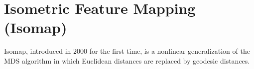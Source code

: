 \section{Isometric Feature Mapping (Isomap)\label{Sec:DR:Isomap}}
Isomap, introduced in 2000 for the first time, is a nonlinear generalization of the MDS algorithm in which Euclidean distances are replaced by geodesic distances.\cite{TenenhaumScience2000}